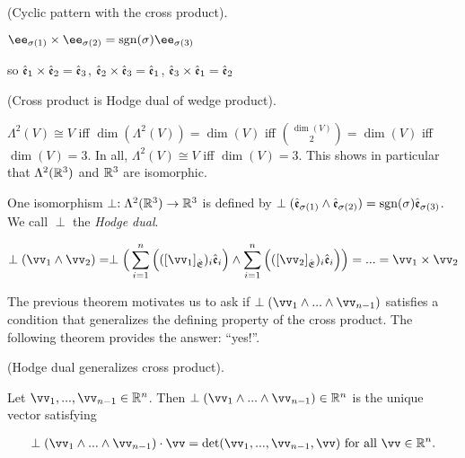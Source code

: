 \begin{theorem}
    (Cyclic pattern with the cross product).
    
     $\ee_{\sigma(1)} \times \ee_{\sigma(2)} = \sgn(\sigma) \ee_{\sigma(3)}$
     
     so $\hat{\mathfrak{e}}_1 \times \hat{\mathfrak{e}}_2 = \hat{\mathfrak{e}}_3$, $\hat{\mathfrak{e}}_2 \times \hat{\mathfrak{e}}_3 = \hat{\mathfrak{e}}_1$, $\hat{\mathfrak{e}}_3 \times \hat{\mathfrak{e}}_1 = \hat{\mathfrak{e}}_2$
\end{theorem}

\begin{deriv}
    (Cross product is Hodge dual of wedge product).
    
    $\Lambda^2(V) \cong V$ iff $\dim(\Lambda^2(V)) = \dim(V)$ iff $\binom{\dim(V)}{2} = \dim(V)$ iff $\dim(V) = 3$. In all, $\Lambda^2(V) \cong V$ iff $\dim(V) = 3$. This shows in particular that $\Lambda^2(\mathbb{R}^3)$ and $\mathbb{R}^3$ are isomorphic.
    
    One isomorphism $\perp:\Lambda^2(\mathbb{R}^3) \rightarrow \mathbb{R}^3$ is defined by $\perp(\hat{\mathfrak{e}}_{\sigma(1)} \wedge \hat{\mathfrak{e}}_{\sigma(2)}) = \text{sgn}(\sigma) \hat{\mathfrak{e}}_{\sigma(3)}$. We call $\perp$ the \textit{Hodge dual}.
    
    
    \begin{align*}
        \perp(\vv_1 \wedge \vv_2)
        = \perp\Big( \sum_{i = 1}^n \Big( ([\vv_1]_\sE)_i \see_i \Big) \wedge \sum_{i = 1}^n \Big( ([\vv_2]_\sE)_i \see_i \Big) \Big)
        = ...
        = \vv_1 \times \vv_2
    \end{align*}
\end{deriv}

The previous theorem motivates us to ask if $\perp(\vv_1 \wedge ... \wedge \vv_{n - 1})$ satisfies a condition that generalizes the defining property of the cross product. The following theorem provides the answer: ``yes!''.

\begin{theorem}
    (Hodge dual generalizes cross product).

    Let $\vv_1, ..., \vv_{n - 1} \in \R^n$. Then $\perp(\vv_1 \wedge ... \wedge \vv_{n - 1}) \in \R^n$ is the unique vector satisfying
    
     \begin{align*}
         \perp(\vv_1 \wedge ... \wedge \vv_{n - 1}) \cdot \vv = \det(\vv_1, ..., \vv_{n - 1}, \vv) \text{ for all $\vv \in \R^n$}.
     \end{align*}
\end{theorem}

